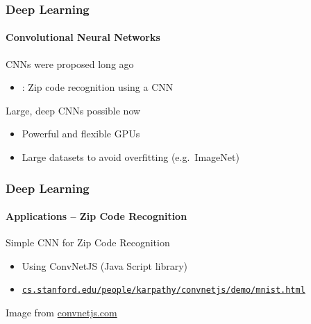 \documentclass[xetex,professionalfont]{beamer}
\begin{document}

\begin{frame}
\frametitle{Deep Learning}
\framesubtitle{Convolutional Neural Networks}

CNNs were proposed long ago
\begin{itemize}
    \item \cite{lecun1989} : Zip code recognition using a CNN
\end{itemize}

\bigskip
Large, deep CNNs possible now
\begin{itemize}
    \item Powerful and flexible GPUs
    \item Large datasets to avoid overfitting (e.g.\ ImageNet)
\end{itemize}

\end{frame}


\begin{frame}
\frametitle{Deep Learning}
\framesubtitle{Applications -- Zip Code Recognition}

Simple CNN for Zip Code Recognition
\begin{itemize}
    \item Using ConvNetJS (Java Script library)
    \item \href{http://cs.stanford.edu/people/karpathy/convnetjs/demo/mnist.html}{\texttt{cs.stanford.edu/people/karpathy/convnetjs/demo/mnist.html}}
\end{itemize}

\bigskip
\begin{center}
    {\centering Image from \url{convnetjs.com}}
\end{center}

\end{frame}

\end{document}

